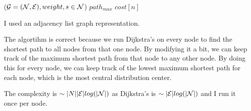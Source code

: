 \begin{problem}
\begin{questions}
\begin{myalgo}{($\mathcal{G} = (\mathcal{N}, \mathcal{E}), weight, s \in \mathcal{N}$)}
                \STATE $path_{max}$ \GETS $cost[n]$
              \ENDIF
          \ENDIF
      \ENDFOR
  \ENDWHILE
\end{myalgo}

I used an adjacency list graph representation. 

The algortihm is correct because we run Dijkstra's on every node to find the shortest path to all nodes from that one node. By modifying it a bit, we can keep track of the maximum shortest path from that node to any other node. By doing this for every node, we can keep track of the lowest maximum shortest path for each node, which is the most central distribution center. 

The complexity is $\sim |N| |\mathcal{E}| log(|\mathcal{N}|)$ as Dijkstra's is $\sim |\mathcal{E}| log(|\mathcal{N}|)$ and I run it once per node.

\end{questions}
\end{problem}

